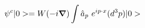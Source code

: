 \begin{equation}
\psi^{c} |0> = W(-i \mbox{\boldmath $\nabla$} ) \int \hat{a}_{p} ~e^{i p \cdot x} (d^{3}p)|0>  
\end{equation}

